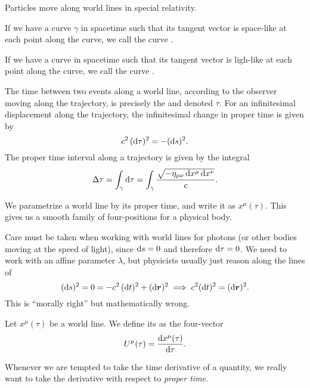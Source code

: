 Particles move along world lines in special relativity.

\M
If we have a curve $\gamma$ in spacetime such that its tangent vector is
space-like at each point along the curve, we call the curve
.

If we have a curve in spacetime such that its tangent vector is
ligh-like at each point along the curve, we call the curve
. 


The time between two events along a world line, according to the
observer moving along the trajectory, is precisely the
 and denoted $\tau$. For an infinitesimal
displacement along the trajectory, the infinitesimal change in proper
time is given by
\begin{equation}
c^{2}\,(\mathrm{d}\tau)^{2} = -(\mathrm{d} s)^{2}.
\end{equation}
The proper time interval along a trajectory is given by the integral
\begin{equation}
\Delta\tau = \int_{\gamma}\mathrm{d}\tau =
\int_{\gamma}\frac{\sqrt{-\eta_{\mu\nu}\,\mathrm{d} x^{\mu}\,\mathrm{d} x^{\nu}}}{c}.
\end{equation}

We parametrize a world line by its proper time, and write it as
$x^{\mu}(\tau)$. This gives us a smooth family of four-positions for a
physical body.

Care must be taken when working with world lines for photons (or other
bodies moving at the speed of light), since $\mathrm{d} s = 0$ and therefore
$\mathrm{d}\tau=0$. We need to work with an affine parameter $\lambda$, but
physicists usually just reason along the lines of
\begin{equation}
(\mathrm{d} s)^{2} = 0 = -c^{2}\,(\mathrm{d} t)^{2} + (\mathrm{d}\boldsymbol{r})^{2}\implies c^{2}(\mathrm{d} t)^{2}=(\mathrm{d}\boldsymbol{r})^{2}.
\end{equation}
This is ``morally right'' but mathematically wrong.

\begin{definition}
Let $x^{\mu}(\tau)$ be a world line. We define its 
as the four-vector
\begin{equation*}
U^{\mu}(\tau) = \frac{\mathrm{d} x^{\mu}(\tau)}{\mathrm{d}\tau}.
\end{equation*}
\end{definition}

\begin{remark}
Whenever we are tempted to take the time derivative of a quantity, we
really want to take the derivative with respect to \emph{proper time}.
\end{remark}

